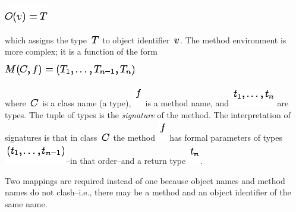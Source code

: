 \documentclass[]{article}
\begin{document}
\includegraphics{img57.png}

which assigns the type \includegraphics{img58.png} to object identifier
\includegraphics{img59.png}. The method environment is more complex; it
is a function of the form \\

\includegraphics{img60.png}

where \includegraphics{img61.png} is a class name (a type),
\includegraphics{img62.png} is a method name, and
\includegraphics{img63.png} are types. The tuple of types is the
\emph{signature} of the method. The interpretation of signatures is that
in class \includegraphics{img61.png} the method
\includegraphics{img62.png} has formal parameters of types
\includegraphics{img64.png}--in that order--and a return type
\includegraphics{img65.png}.

Two mappings are required instead of one because object names and method
names do not clash--i.e., there may be a method and an object identifier
of the same name.
\end{document}
